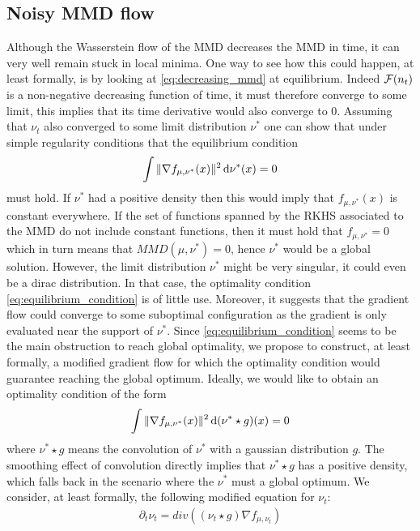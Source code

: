 \subsection{Noisy MMD flow}

Although the Wasserstein flow of the MMD decreases the MMD in time, it can very well remain stuck in local minima. One way to see how this could happen, at least formally, is by looking at \cref{eq:decreasing_mmd} at equilibrium. Indeed ${{\mathcal F}}(n_t)$ is a non-negative decreasing function of time, it must therefore converge to some limit, this implies that its time derivative would also converge to $0$. Assuming that $\nu_t$ also converged to some limit distribution $\nu^{*}$ one can show that under simple regularity conditions that the equilibrium condition
\begin{align}\label{eq:equilibrium_condition}
	\int \Vert \nabla f_{\mu,\nu^{*}}(x)\Vert^2 \mathop{}\!\mathrm{d} \nu^{*}(x) =0  
\end{align} 
must hold. If $\nu^*$ had a positive density then this would imply that $f_{\mu,\nu^{*}}(x)$ is constant everywhere. If the set of functions spanned by the RKHS associated to the MMD do not include constant functions, then it must hold that $f_{\mu,\nu^{*}}=0$ which in turn means that $MMD(\mu,\nu^{*})=0$, hence $\nu^*$ would be a global solution. However, the limit distribution $\nu^*$  might be very singular, it could even be a dirac distribution. In that case, the optimality condition \cref{eq:equilibrium_condition} is of little use. Moreover, it suggests that the gradient flow could converge to some suboptimal configuration as the gradient is only evaluated near the support of $\nu^*$.
Since \cref{eq:equilibrium_condition} seems to be the main obstruction to reach global optimality, we propose to construct, at least formally, a modified gradient flow for which the optimality condition would guarantee reaching the global optimum.
Ideally, we would like to obtain an optimality condition of the form
\begin{align}\label{eq:soothed_equilibrium_condition}
	\int \Vert \nabla f_{\mu,\nu^{*}}(x)\Vert^2 \mathop{}\!\mathrm{d} (\nu^{*}\star g)(x) =0  
\end{align}
where $\nu^{*}\star g$ means the convolution of $\nu^*$ with a gaussian distribution $g$. The smoothing effect of convolution directly implies that $\nu^{*}\star g$ has a positive density, which falls back in the scenario where the $\nu^*$ must a global optimum.
We consider, at least formally, the following modified equation for $\nu_t$:
\begin{align}\label{eq:smoothed_continuity_equation_mmd}
	\partial_t \nu_t = div((\nu_t \star g) \nabla f_{\mu,\nu_t} )
\end{align}
